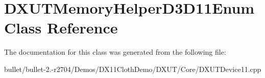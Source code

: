 \hypertarget{class_d_x_u_t_memory_helper_d3_d11_enum}{\section{D\+X\+U\+T\+Memory\+Helper\+D3\+D11\+Enum Class Reference}
\label{class_d_x_u_t_memory_helper_d3_d11_enum}
}


The documentation for this class was generated from the following file\+:\begin{DoxyCompactItemize}
\item 
bullet/bullet-\/2.-\/r2704/\+Demos/\+D\+X11\+Cloth\+Demo/\+D\+X\+U\+T/\+Core/D\+X\+U\+T\+Device11.\+cpp\end{DoxyCompactItemize}

